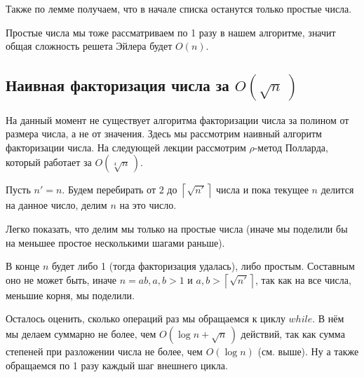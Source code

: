 \documentclass[a4paper, 12pt]{article}
\begin{document}
Также по лемме получаем, что в начале списка останутся только простые числа.

Простые числа мы тоже рассматриваем по 1 разу в нашем алгоритме, значит
общая сложность решета Эйлера будет $O(n)$.

\subsection{Наивная факторизация числа за $O(\sqrt{n}\,)$}

На данный момент не существует алгоритма факторизации числа за
полином от размера числа, а не от значения. Здесь мы рассмотрим наивный алгоритм
факторизации числа. На следующей лекции рассмотрим $\rho$-метод Полларда, который работает за $O(\sqrt[4]{n}\,)$.

Пусть $n' = n$.
Будем перебирать от $2$ до $\left\lceil \sqrt{n'} \right\rceil$ числа и пока
текущее $n$ делится на данное число, делим $n$ на это число.

Легко показать, что делим мы только на простые числа (иначе мы поделили бы на
меньшее простое несколькими шагами раньше).

В конце $n$ будет либо 1 (тогда факторизация удалась), либо простым. Составным
оно не может быть, иначе $n = ab, a, b > 1$ и $a, b > \left\lceil \sqrt{n'}\right\rceil$, 
так как на все числа, меньшие корня, мы поделили.

Осталось оценить, сколько операций раз мы обращаемся к циклу $while$. В нём мы делаем
суммарно не более, чем $O(\log n + \sqrt{n}\,)$ действий, так как сумма
степеней при разложении числа не более, чем $O(\log n)$ (см. выше). Ну а также
обращаемся по 1 разу каждый шаг внешнего цикла.
\end{document}

